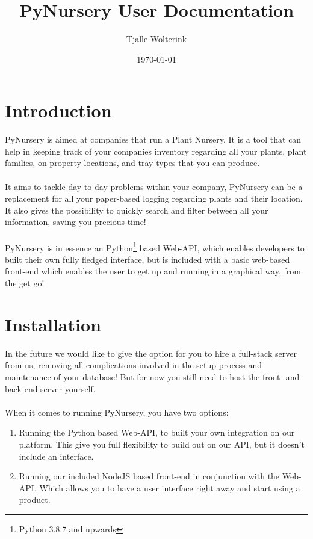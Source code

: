 \documentclass{article}
\title{PyNursery User Documentation}
\author{Tjalle Wolterink}
\date{\today}
\begin{document}
\maketitle
\newpage
\tableofcontents
\newpage
\section{Introduction}
PyNursery is aimed at companies that run a Plant Nursery. It is a tool that can help in keeping track of your companies inventory regarding all your plants, plant families, on-property locations, and tray types that you can produce.\\\\
It aims to tackle day-to-day problems within your company, PyNursery can be a replacement for all your paper-based logging regarding plants and their location. It also gives the possibility to quickly search and filter between all your information, saving you precious time!\\\\
PyNursery is in essence an Python\footnote{Python 3.8.7 and upwards} based Web-API, which enables developers to built their own fully fledged interface, but is included with a basic web-based front-end which enables the user to get up and running in a graphical way, from the get go!

\section{Installation}
In the future we would like to give the option for you to hire a full-stack server from us, removing all complications involved in the setup process and maintenance of your database! But for now you still need to host the front- and back-end server yourself.\\\\
When it comes to running PyNursery, you have two options:
\begin{enumerate}
    \item Running the Python based Web-API, to built your own integration on our platform. This give you full flexibility to build out on our API, but it doesn't include an interface.
    \item Running our included NodeJS based front-end in conjunction with the Web-API. Which allows you to have a user interface right away and start using a product.
\end{enumerate}
\end{document}
